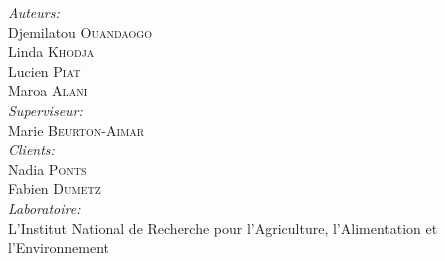 \documentclass{report}
\begin{document}
\begin{titlepage}
\Large \emph{Auteurs:}\\
Djemilatou \textsc{Ouandaogo}\\
Linda \textsc{Khodja}\\
Lucien \textsc{Piat}\\
Maroa \textsc{Alani}\\[0.8cm]

\Large \emph{Superviseur:}\\
 Marie \textsc{Beurton-Aimar}\\[0.8cm]

\Large \emph{Clients:}\\
Nadia \textsc{Ponts}\\
Fabien \textsc{Dumetz}\\[0.8cm]

\Large \emph{Laboratoire:}\\
L’Institut National de Recherche pour l’Agriculture, l’Alimentation et l’Environnement\\[0.8cm]
 
\reportyear
\vfill
\end{titlepage}

\tableofcontents
\newpage










\appendix
 
\end{document}
